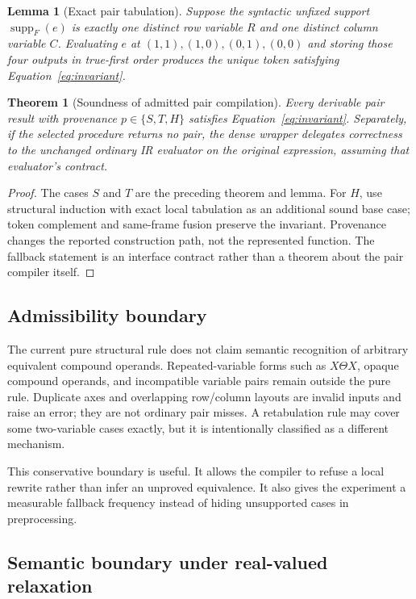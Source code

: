 \documentclass[10pt]{article}
\newcommand{\supp}{\operatorname{supp}}
\theoremstyle{plain}
\newtheorem{theorem}{Theorem}
\newtheorem{lemma}{Lemma}
\theoremstyle{definition}
\theoremstyle{remark}
\begin{document}
\begin{lemma}[Exact pair tabulation]
Suppose the syntactic unfixed support $\supp_F(e)$ is exactly one distinct row variable $R$ and one distinct column variable $C$. Evaluating $e$ at $(1,1),(1,0),(0,1),(0,0)$ and storing those four outputs in true-first order produces the unique token satisfying Equation~\eqref{eq:invariant}.
\end{lemma}

\begin{theorem}[Soundness of admitted pair compilation]
Every derivable pair result with provenance $p\in\{S,T,H\}$ satisfies Equation~\eqref{eq:invariant}. Separately, if the selected procedure returns no pair, the dense wrapper delegates correctness to the unchanged ordinary IR evaluator on the original expression, assuming that evaluator's contract.
\end{theorem}

\begin{proof}
The cases $S$ and $T$ are the preceding theorem and lemma. For $H$, use structural induction with exact local tabulation as an additional sound base case; token complement and same-frame fusion preserve the invariant. Provenance changes the reported construction path, not the represented function. The fallback statement is an interface contract rather than a theorem about the pair compiler itself.
\end{proof}

\subsection{Admissibility boundary}

The current pure structural rule does not claim semantic recognition of arbitrary equivalent compound operands. Repeated-variable forms such as $X\Theta X$, opaque compound operands, and incompatible variable pairs remain outside the pure rule. Duplicate axes and overlapping row/column layouts are invalid inputs and raise an error; they are not ordinary pair misses. A retabulation rule may cover some two-variable cases exactly, but it is intentionally classified as a different mechanism.

This conservative boundary is useful. It allows the compiler to refuse a local rewrite rather than infer an unproved equivalence. It also gives the experiment a measurable fallback frequency instead of hiding unsupported cases in preprocessing.

\subsection{Semantic boundary under real-valued relaxation}
\label{sec:soft-boundary}
\end{document}
